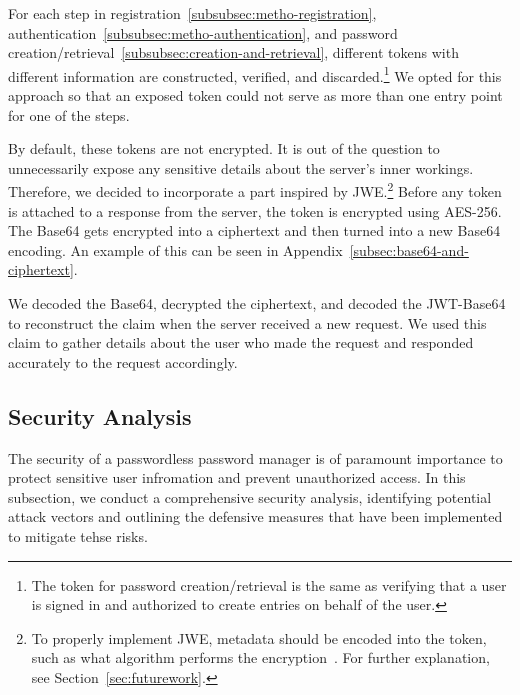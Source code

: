 For each step in registration~\ref{subsubsec:metho-registration},
authentication~\ref{subsubsec:metho-authentication}, and
password creation/retrieval~\ref{subsubsec:creation-and-retrieval}, different
tokens with different information are constructed, verified, and
discarded.\footnote{
  The token for password creation/retrieval is the same as verifying that a user
  is signed in and authorized to create entries on behalf of the user.
}
We opted for this approach so that an exposed token could not serve as more than
one entry point for one of the steps.

By default, these tokens are not encrypted.
It is out of the question to unnecessarily expose any sensitive details about
the server's inner workings.
Therefore, we decided to incorporate a part inspired by JWE.\footnote{
  To properly implement JWE, metadata should be encoded into the token, such as
  what algorithm performs the encryption~\cite{rfc7516}. For further
  explanation, see Section~\ref{sec:futurework}.
}
Before any token is attached to a response from the server, the token is
encrypted using AES-256\@.
The Base64 gets encrypted into a ciphertext and then turned into a new Base64
encoding.
An example of this can be seen in Appendix~\ref{subsec:base64-and-ciphertext}.

We decoded the Base64, decrypted the ciphertext, and decoded the JWT-Base64 to
reconstruct the claim when the server received a new request.
We used this claim to gather details about the user who made the request and
responded accurately to the request accordingly.


\subsection{Security Analysis}\label{subsec:security-analysis}
The security of a passwordless password manager is of paramount importance to
protect sensitive user infromation and prevent unauthorized access.
In this subsection, we conduct a comprehensive security analysis, identifying
  potential attack vectors and outlining the defensive measures that have
  been implemented to mitigate tehse risks.

